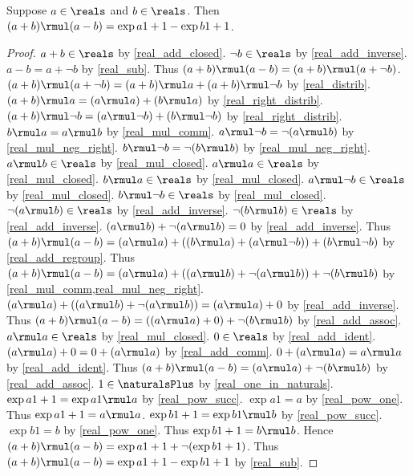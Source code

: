 \begin{theorem}\label{real_diff_squares}
    Suppose $a\in\reals$ and $b\in\reals$.
    Then $(a + b) \rmul (a - b) = \exp{a}{1+1} - \exp{b}{1+1}$.
\end{theorem}
\begin{proof}
    $a + b\in\reals$ by \cref{real_add_closed}.
    $\neg{b}\in\reals$ by \cref{real_add_inverse}.
    $a - b = a + \neg{b}$ by \cref{real_sub}.
    Thus $(a + b) \rmul (a - b) = (a + b) \rmul (a + \neg{b})$.
    $(a + b) \rmul (a + \neg{b}) = (a + b) \rmul a + (a + b) \rmul \neg{b}$ by \cref{real_distrib}.
    $(a + b) \rmul a = (a \rmul a) + (b \rmul a)$ by \cref{real_right_distrib}.
    $(a + b) \rmul \neg{b} = (a \rmul \neg{b}) + (b \rmul \neg{b})$ by \cref{real_right_distrib}.
    $b \rmul a = a \rmul b$ by \cref{real_mul_comm}.
    $a \rmul \neg{b} = \neg{(a \rmul b)}$ by \cref{real_mul_neg_right}.
    $b \rmul \neg{b} = \neg{(b \rmul b)}$ by \cref{real_mul_neg_right}.
    $a \rmul b\in\reals$ by \cref{real_mul_closed}.
    $a \rmul a\in\reals$ by \cref{real_mul_closed}.
    $b \rmul a\in\reals$ by \cref{real_mul_closed}.
    $a \rmul \neg{b}\in\reals$ by \cref{real_mul_closed}.
    $b \rmul \neg{b}\in\reals$ by \cref{real_mul_closed}.
    $\neg{(a \rmul b)}\in\reals$ by \cref{real_add_inverse}.
    $\neg{(b \rmul b)}\in\reals$ by \cref{real_add_inverse}.
    $(a \rmul b) + \neg{(a \rmul b)} = 0$ by \cref{real_add_inverse}.
    Thus $(a + b) \rmul (a - b) = (a \rmul a) + ((b \rmul a) + (a \rmul \neg{b})) + (b \rmul \neg{b})$
        by \cref{real_add_regroup}.
    Thus $(a + b) \rmul (a - b) = (a \rmul a) + ((a \rmul b) + \neg{(a \rmul b)}) + \neg{(b \rmul b)}$
        by \cref{real_mul_comm,real_mul_neg_right}.
    $(a \rmul a) + ((a \rmul b) + \neg{(a \rmul b)}) = (a \rmul a) + 0$ by \cref{real_add_inverse}.
    Thus $(a + b) \rmul (a - b) = ((a \rmul a) + 0) + \neg{(b \rmul b)}$ by \cref{real_add_assoc}.
    $a \rmul a\in\reals$ by \cref{real_mul_closed}.
    $0\in\reals$ by \cref{real_add_ident}.
    $(a \rmul a) + 0 = 0 + (a \rmul a)$ by \cref{real_add_comm}.
    $0 + (a \rmul a) = a \rmul a$ by \cref{real_add_ident}.
    Thus $(a + b) \rmul (a - b) = (a \rmul a) + \neg{(b \rmul b)}$ by \cref{real_add_assoc}.
    $1\in\naturalsPlus$ by \cref{real_one_in_naturals}.
    $\exp{a}{1+1} = \exp{a}{1} \rmul a$ by \cref{real_pow_succ}.
    $\exp{a}{1} = a$ by \cref{real_pow_one}.
    Thus $\exp{a}{1+1} = a \rmul a$.
    $\exp{b}{1+1} = \exp{b}{1} \rmul b$ by \cref{real_pow_succ}.
    $\exp{b}{1} = b$ by \cref{real_pow_one}.
    Thus $\exp{b}{1+1} = b \rmul b$.
    Hence $(a + b) \rmul (a - b) = \exp{a}{1+1} + \neg{(\exp{b}{1+1})}$.
    Thus $(a + b) \rmul (a - b) = \exp{a}{1+1} - \exp{b}{1+1}$ by \cref{real_sub}.
\end{proof}

